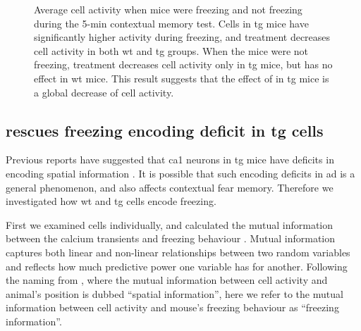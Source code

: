 \begin{figure}[h]
    \begin{subfigure}[h]{\textwidth}
        
        \caption{\label{f.ad.actf}}
    \end{subfigure}
    \begin{subfigure}[h]{\textwidth}
        
        \caption{\label{f.ad.actnf}}
    \end{subfigure}
    \caption[Cell activity during freezing.]{Average cell activity when mice were  freezing and  not freezing during the 5-min contextual memory test. Cells in \gls{tg} mice have significantly higher activity during freezing, and \tglu{} treatment decreases cell activity in both \gls{wt} and \gls{tg} groups. When the mice were not freezing, \tglu{} treatment decreases cell activity only in \gls{tg} mice, but has no effect in \gls{wt} mice. This result suggests that the effect of \tglu{} in \gls{tg} mice is a global decrease of cell activity. \label{f.ad.activity_freezing}}
\end{figure}

\subsection{\tglu{} rescues freezing encoding deficit in \gls{tg} cells}

Previous reports have suggested that \gls{ca1} neurons in \gls{tg} mice have deficits in encoding spatial information \citep{cheng13}. It is possible that such encoding deficits in \gls{ad} is a general phenomenon, and also affects contextual fear memory. Therefore we investigated how \gls{wt} and \gls{tg} cells encode freezing. 

First we examined cells individually, and calculated the mutual information between the calcium transients and freezing behaviour \citep{ross14, victor02}. Mutual information captures both linear and non-linear relationships between two random variables and reflects how much predictive power one variable has for another. Following the naming from \citet{skaggs93}, where the mutual information between cell activity and animal's position is dubbed ``spatial information'', here we refer to the mutual information between cell activity and mouse's freezing behaviour as ``freezing information''. 

